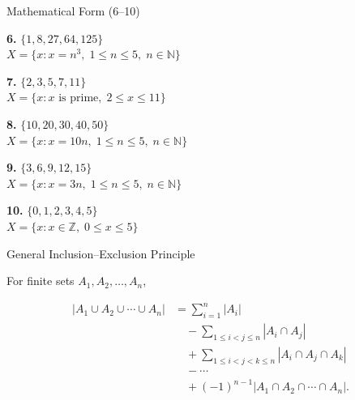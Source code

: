 \documentclass{beamer}
\begin{document}
\begin{frame}{Mathematical Form (6--10)}
\footnotesize

\textbf{6.} $\{1,8,27,64,125\}$\\
$X=\{x:x=n^3,\;1\le n\le5,\;n\in\mathbb N\}$

\vspace{0.1cm}

\textbf{7.} $\{2,3,5,7,11\}$\\
$X=\{x:x\text{ is prime},\;2\le x\le11\}$

\vspace{0.1cm}

\textbf{8.} $\{10,20,30,40,50\}$\\
$X=\{x:x=10n,\;1\le n\le5,\;n\in\mathbb N\}$

\vspace{0.1cm}

\textbf{9.} $\{3,6,9,12,15\}$\\
$X=\{x:x=3n,\;1\le n\le5,\;n\in\mathbb N\}$

\vspace{0.1cm}

\textbf{10.} $\{0,1,2,3,4,5\}$\\
$X=\{x:x\in\mathbb Z,\;0\le x\le5\}$

\end{frame}
\begin{frame}{General Inclusion--Exclusion Principle}
\small

For finite sets $A_1,A_2,\ldots,A_n$,

\[
\begin{aligned}
|A_1\cup A_2\cup\cdots\cup A_n|
&=\sum_{i=1}^{n}|A_i| \\
&\quad-\sum_{1\le i<j\le n}|A_i\cap A_j| \\
&\quad+\sum_{1\le i<j<k\le n}
|A_i\cap A_j\cap A_k| \\
&\quad-\cdots \\
&\quad+(-1)^{n-1}
|A_1\cap A_2\cap\cdots\cap A_n|.
\end{aligned}
\]

\vspace{0.3cm}


\end{frame}
\end{document}
